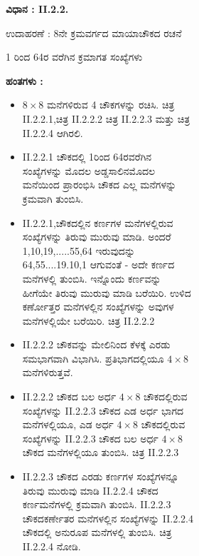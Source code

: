 \begin{figure}[H]
\begin{figure}[H]
\begin{figure}[h]
\textbf{ವಿಧಾನ : II.2.2.}

ಉದಾಹರಣೆ : 8ನೇ ಕ್ರಮವರ್ಗದ ಮಾಯಾಚೌಕದ ರಚನೆ

1 ರಿಂದ 64ರ ವರೆಗಿನ ಕ್ರಮಾಗತ ಸಂಖ್ಯೆಗಳು

\smallskip

\textbf{ಹಂತಗಳು :}
\begin{itemize}
	\item $8 \times 8$ ಮನೆಗಳಿರುವ 4 ಚೌಕಗಳನ್ನು ರಚಿಸಿ. ಚಿತ್ರ II.2.2.1,ಚಿತ್ರ II.2.2.2 ಚಿತ್ರ II.2.2.3 ಮತ್ತು ಚಿತ್ರ II.2.2.4 ಆಗಿರಲಿ.
	\item II.2.2.1 ಚೌಕದಲ್ಲಿ 1ರಿಂದ 64ರವರೆಗಿನ ಸಂಖ್ಯೆಗಳನ್ನು ಮೊದಲ ಅಡ್ಡಸಾಲಿನ\break ಮೊದಲ ಮನೆಯಿಂದ ಪ್ರಾರಂಭಿಸಿ ಚೌಕದ ಎಲ್ಲ ಮನೆಗಳನ್ನು ಕ್ರಮವಾಗಿ ತುಂಬಿಸಿ.
	\item II.2.2.1,ಚೌಕದಲ್ಲಿನ ಕರ್ಣಗಳ ಮನೆಗಳಲ್ಲಿರುವ ಸಂಖ್ಯೆಗಳನ್ನು ತಿರುವು ಮುರುವು ಮಾಡಿ. ಅಂದರೆ 1,10,19,.....55,64 ಇರುವುದನ್ನು 64,55....19.10,1 ಆಗುವಂತೆ - ಅದೇ ಕರ್ಣದ ಮನೆಗಳಲ್ಲಿ ತುಂಬಿಸಿ. ಇನ್ನೊಂದು ಕರ್ಣವನ್ನು ಹೀಗೆಯೇ ತಿರುವು ಮುರುವು ಮಾಡಿ ಬರೆಯಿರಿ. ಉಳಿದ ಕರ್ಣೋತ್ತರ ಮನೆಗಳಲ್ಲಿನ ಸಂಖ್ಯೆ\-ಗಳನ್ನು ಅವುಗಳ ಮನೆಗಳಲ್ಲಿಯೇ ಬರೆಯಿರಿ. ಚಿತ್ರ II.2.2.2
	\item II.2.2.2 ಚೌಕವನ್ನು ಮೇಲಿನಿಂದ ಕೆಳಕ್ಕೆ ಎರಡು ಸಮಭಾಗವಾಗಿ ವಿಭಾಗಿಸಿ. ಪ್ರತಿಭಾಗದಲ್ಲಿಯೂ $4 \times 8$ ಮನೆಗಳಿರುತ್ತವೆ.
	\item II.2.2.2 ಚೌಕದ ಬಲ ಅರ್ಧ $4 \times 8$ ಚೌಕದಲ್ಲಿರುವ ಸಂಖ್ಯೆಗಳನ್ನು II.2.2.3 ಚೌಕದ ಎಡ ಅರ್ಧ ಭಾಗದ ಮನೆಗಳಲ್ಲಿಯೂ, ಎಡ ಅರ್ಧ $4 \times 8$ ಚೌಕದಲ್ಲಿರುವ ಸಂಖ್ಯೆಗಳನ್ನು II.2.2.3 ಚೌಕದ ಬಲ ಅರ್ಧ $4 \times 8$ ಚೌಕದ ಮನೆಗಳಲ್ಲಿಯೂ ತುಂಬಿಸಿ. ಚಿತ್ರ II.2.2.3
	\item II.2.2.3 ಚೌಕದ ಎರಡು ಕರ್ಣಗಳ ಸಂಖ್ಯೆಗಳನ್ನೂ ತಿರುವು ಮುರುವು ಮಾಡಿ II.2.2.4 ಚೌಕದ ಕರ್ಣಮನೆಗಳಲ್ಲಿ ಕ್ರಮವಾಗಿ ತುಂಬಿಸಿ. II.2.2.3 ಚೌಕದ\break ಕರ್ಣೇತರ ಮನೆಗಳಲ್ಲಿನ ಸಂಖ್ಯೆಗಳನ್ನು II.2.2.4 ಚೌಕದಲ್ಲಿ ಅನುರೂಪ ಮನೆ\-ಗಳಲ್ಲಿ ತುಂಬಿಸಿ. ಚಿತ್ರ II.2.2.4 ನೋಡಿ.


\end{itemize}
\end{figure}
\end{figure}
\end{figure}
